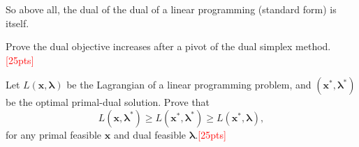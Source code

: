 \documentclass[10pt]{article}
\newenvironment{problem}[2][Problem]{\begin{trivlist}
\item[\hskip \labelsep {\bfseries #1}\hskip \labelsep {\bfseries #2.}]}{\end{trivlist}}
\begin{document}
So above all, the dual of the dual of a linear programming (standard form) is itself.\\

\newpage


\begin{problem}{2}
    Prove the dual objective increases after a pivot of the dual simplex method.\textcolor{red}{[25pts]}
\end{problem}











\newpage


\begin{problem}{3}
    Let $L(\bm{x}, \bm{\lambda})$ be the Lagrangian of a linear programming problem, and $(\bm{x}^*, \bm{\lambda}^*)$ be the optimal primal-dual solution. Prove that $$L(\bm{x}, \bm{\lambda}^*) \geq L(\bm{x}^*, \bm{\lambda}^*) \geq L(\bm{x}^*, \bm{\lambda}),$$ for any primal feasible $\bm{x}$ and dual feasible $\bm{\lambda}$.\textcolor{red}{[25pts]}
\end{problem}








\newpage

\end{document}
